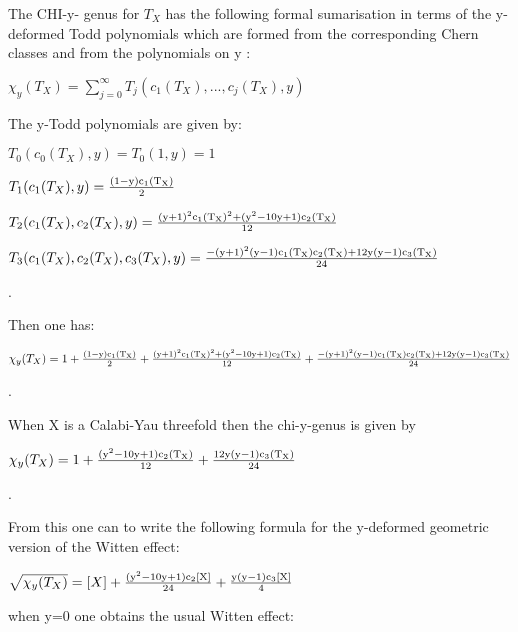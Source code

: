 \documentclass[a4paper,a4paper]{article}
\begin{document}
The CHI-y- genus for $T_{X}$  has the following formal sumarisation in terms of the y-deformed Todd polynomials which are formed from the corresponding Chern classes and from the polynomials on y :
\begin{center}
{  ${\chi}_y(T_{X})  = \sum_{j=0}^{\infty}T_j(c_1(T_{X}),...,c_j(T_{X}),y) $ }
\end{center}

The y-Todd  polynomials are given by:
\begin{center}
{  $ T_0(c_0(T_{X}),y) =T _0(1,y)=1 $ }
\end{center}
\begin{center}
{  $ T_1(c_1(T_{X}),y) = \frac{\rm (1-y)c_1(T_{X})}{\rm 2} $ }
\end{center}
\begin{center}
{  $ T_2(c_1(T_{X}),c_2(T_{X}),y) = \frac{\rm (y+1)^2c_1(T_{X})^2+(y^2-10y+1)c_2(T_{X})}{\rm 12} $ }
\end{center}
\begin{center}
{  $ T_3(c_1(T_{X}),c_2(T_{X}),c_3(T_{X}),y) = \frac{\rm -(y+1)^2(y-1)c_1(T_{X})c_2(T_{X})+12y(y-1)c_3(T_{X})}{\rm 24} $ }
\end{center}.

Then one has:

\begin{center}
{  $ {\chi}_y(T_{X}) = 1+\frac{\rm (1-y)c_1(T_{X})}{\rm 2}+\frac{\rm (y+1)^2c_1(T_{X})^2+(y^2-10y+1)c_2(T_{X})}{\rm 12}+\frac{\rm -(y+1)^2(y-1)c_1(T_{X})c_2(T_{X})+12y(y-1)c_3(T_{X})}{\rm 24} $ }
\end{center}.

When X is a Calabi-Yau threefold then the chi-y-genus is given by


\begin{center}
{  $ {\chi}_y(T_{X}) = 1+\frac{\rm (y^2-10y+1)c_2(T_{X})}{\rm 12}+\frac{\rm 12y(y-1)c_3(T_{X})}{\rm 24} $ }
\end{center}.

From this one can to write the following formula for the y-deformed geometric version of the Witten effect:

\begin{center}
{  $\sqrt{{\chi}_y(T_{X})} =[X]+\frac{\rm (y^2-10y+1)c_{2}[X]}{\rm 24}+\frac{\rm y(y-1)c_{3}[X]}{\rm 4} $ }
\end{center}
when y=0 one obtains the usual Witten effect:
\end{document}
